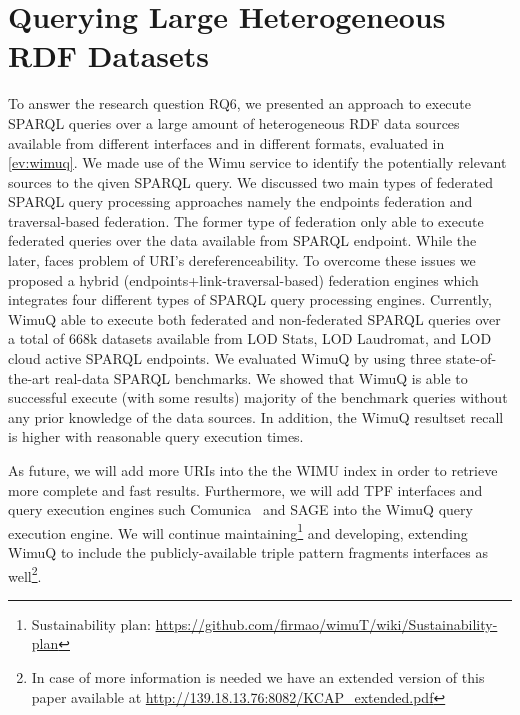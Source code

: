 \section{Querying Large Heterogeneous RDF Datasets}
To answer the research question RQ6, we presented an approach to execute SPARQL queries over a large amount of heterogeneous RDF data sources available from different interfaces and in different formats, evaluated in \ref{ev:wimuq}. We made use of the Wimu service to identify the potentially relevant sources to the qiven SPARQL query. We discussed two main types of federated SPARQL query processing approaches namely the endpoints federation and traversal-based federation. The former type of federation only able to execute federated queries over the data available from SPARQL endpoint. While the later, faces problem of URI's dereferenceability. To overcome these issues we proposed a hybrid (endpoints+link-traversal-based) federation engines which integrates four different types of SPARQL query processing engines. Currently, WimuQ able to execute both federated and non-federated SPARQL queries over a total of 668k datasets available from LOD Stats, LOD Laudromat, and LOD cloud active SPARQL endpoints. We evaluated WimuQ by using three state-of-the-art real-data SPARQL benchmarks. We showed that WimuQ is able to successful execute (with some results) majority of the benchmark queries without any prior knowledge of the data sources. In addition, the WimuQ resultset recall is higher with reasonable query execution times. 

As future, we will add more URIs into the the WIMU index in order to retrieve more complete and fast results. Furthermore, we will add TPF interfaces and query execution engines such Comunica~\cite{taelman2018comunica} and SAGE \cite{DBLP:journals/corr/abs-1806-00227} into the WimuQ query execution engine. We will continue maintaining\footnote{Sustainability plan: \url{https://github.com/firmao/wimuT/wiki/Sustainability-plan}} and developing, extending WimuQ to include the publicly-available triple pattern fragments interfaces as well\footnote{\label{note1}In case of more information is needed we have an extended version of this paper available at \url{http://139.18.13.76:8082/KCAP_extended.pdf}}.

